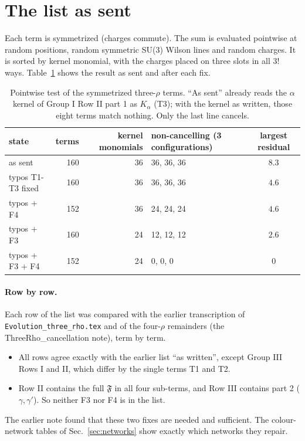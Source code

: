 \documentclass[10pt]{article}
\numberwithin{equation}{section}
\begin{document}
\section{The list as sent}\label{sec:sent}
Each term is symmetrized (charges commute). The sum is evaluated pointwise at random positions, random symmetric SU(3) Wilson lines and random charges. It is sorted by kernel monomial, with the charges placed on three slots in all $3!$ ways. Table~\ref{tab:states} shows the result as sent and after each fix.
\begin{table}[H]
\centering\small
\begin{tabular}{@{}l r r l c@{}}
state & terms & kernel monomials & non-cancelling (3 configurations) & largest residual\\ \hline
as sent & 160 & 36 & 36, 36, 36 & $8.3$\\
typos T1-T3 fixed & 160 & 36 & 36, 36, 36 & $4.6$\\
typos + F4 & 152 & 36 & 24, 24, 24 & $4.6$\\
typos + F3 & 160 & 24 & 12, 12, 12 & $2.6$\\
typos + F3 + F4 & 152 & 24 & 0, 0, 0 & $0$\\
\end{tabular}
\caption{Pointwise test of the symmetrized three-$\rho$ terms. ``As sent'' already reads the $\alpha$ kernel of Group I Row II part 1 as $K_\alpha$ (T3); with the kernel as written, those eight terms match nothing. Only the last line cancels.}
\label{tab:states}
\end{table}
\paragraph{Row by row.} Each row of the list was compared with the earlier transcription of \texttt{Evolution\_three\_rho.tex} and of the four-$\rho$ remainders (the ThreeRho\_cancellation note), term by term.
\begin{itemize}
\item All rows agree exactly with the earlier list ``as written'', except Group III Rows I and II, which differ by the single terms T1 and T2.
\item Row II contains the full $\mathfrak F$ in all four sub-terms, and Row III contains part 2 ($\gamma,\gamma'$). So neither F3 nor F4 is in the list.
\end{itemize}
The earlier note found that these two fixes are needed and sufficient. The colour-network tables of Sec.~\ref{sec:networks} show exactly which networks they repair.
\end{document}
